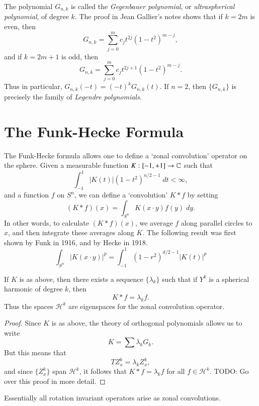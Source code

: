 The polynomial $G_{n,k}$ is called the \emph{Gegenbauer polynomial}, or \emph{ultraspherical polynomial}, of degree $k$. The proof in Jean Gallier's notes shows that if $k = 2m$ is even, then
%
\[ G_{n,k} = \sum_{j = 0}^m c_j t^{2j} (1 - t^2)^{m - j}, \]
%
and if $k = 2m + 1$ is odd, then
%
\[ G_{n,k} = \sum_{j = 0}^m c_j t^{2j+1} (1 - t^2)^{m - j}. \]
%
Thus in particular, $G_{n,k}(-t) = (-t)^k G_{n,k}(t)$. If $n = 2$, then $\{ G_{n,k} \}$ is precisely the family of \emph{Legendre polynomials}.


\section{The Funk-Hecke Formula}

The Funk-Hecke formula allows one to define a `zonal convolution' operator on the sphere. Given a measurable function $K: [-1,+1] \to \operatorname{\mathbb{C}}$ such that
%
\[ \int_{-1}^1 |K(t)| (1 - t^2)^{n/2 - 1}\; dt < \infty, \]
%
and a function $f$ on $S^n$, we can define a `convolution' $K * f$ by setting
%
\[ (K * f)(x) = \int_{S^n} K(x \cdot y) f(y)\; dy. \]
%
In other words, to calculate $(K * f)(x)$, we average $f$ along parallel circles to $x$, and then integrate these averages along $K$. The following result was first shown by Funk in 1916, and by Hecke in 1918.
%
\[ \int_{S^n} |K(x \cdot y)|^p = \int_{-1}^1 (1 - r^2)^{d/2 - 1} |K(t)|^p \]

\begin{theorem}
    If $K$ is as above, then there exists a sequence $\{ \lambda_k \}$ such that if $Y^k$ is a spherical harmonic of degree $k$, then
    \[ K * f = \lambda_k f. \]
    Thus the spaces $\mathcal{H}^k$ are eigenspaces for the zonal convolution operator.
\end{theorem}
\begin{proof}
    Since $K$ is as above, the theory of orthogonal polynomials allows us to write
    \[ K = \sum \lambda_k G_k. \]
    But this means that
    \[ T Z^k_x = \lambda_k Z^k_x, \]
    and since $\{ Z^k_x \}$ span $\mathcal{H}^k$, it follows that $K * f = \lambda_k f$ for all $f \in \mathcal{H}^k$. TODO: Go over this proof in more detail.
\end{proof}

Essentially all rotation invariant operators arise as zonal convolutions.

